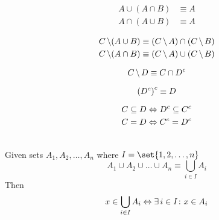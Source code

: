 \begin{definition}
\begin{align}
    A \cup (A \cap B) &\equiv A \\
    A \cap (A \cup B) &\equiv A
\end{align}
\end{definition}

\begin{definition}
\begin{align}
    C \operatorname{\backslash} (A \cup B) &\equiv (C \operatorname{\backslash} A) \cap (C \operatorname{\backslash} B) \\
    C \operatorname{\backslash} (A \cap B) &\equiv (C \operatorname{\backslash} A) \cup (C \operatorname{\backslash} B)
\end{align}
\end{definition}

\begin{definition}
\begin{equation}
    C \operatorname{\backslash} D \equiv C \cap {D}^{c}
\end{equation}
\end{definition}

\begin{definition}
\begin{equation}
    {({D}^{c})}^{c} \equiv D
\end{equation}
\end{definition}

\begin{definition}[Contraposition]
\begin{align}
    C \subseteq D &\Leftrightarrow {D}^{c} \subseteq {C}^{c} \\
    C = D &\Leftrightarrow {C}^{c} = {D}^{c}
\end{align}
\end{definition}

\begin{definition}\ \\
    Given sets $A_1, A_2, \dots, A_n$ where $I = \set{1, 2, \dots, n}$
    \begin{equation}
        A_1 \cup A_2 \cup \dots \cup A_n \equiv \bigcup_{i \in I} A_i
    \end{equation}
    Then
    \begin{equation}
        x \in \bigcup_{i \in I} A_i \Leftrightarrow \operatorname{\exists} i \in I \colon x \in A_i
    \end{equation}
\end{definition}

